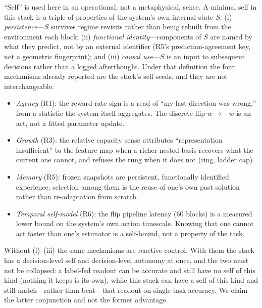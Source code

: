 \documentclass[preprint,12pt]{elsarticle}
\begin{document}
``Self'' is used here in an operational, not a metaphysical, sense. A minimal
self in this stack is a triple of properties of the system's own internal
state $S$: (i) \emph{persistence}---$S$ survives regime revisits rather than
being rebuilt from the environment each block; (ii) \emph{functional
identity}---components of $S$ are named by what they predict, not by an
external identifier (R5's prediction-agreement key, not a geometric
fingerprint); and (iii) \emph{causal use}---$S$ is an input to subsequent
decisions rather than a logged afterthought. Under that definition the four
mechanisms already reported are the stack's self-seeds, and they are not
interchangeable:

\begin{itemize}[leftmargin=1.4em,itemsep=2pt,topsep=2pt]
\item \emph{Agency} (R1): the reward-rate sign is a read of ``my last
direction was wrong,'' from a statistic the system itself aggregates. The
discrete flip $w\to-w$ is an act, not a fitted parameter update.
\item \emph{Growth} (R3): the relative capacity sense attributes
``representation insufficient'' to the feature map when a richer nested
basis recovers what the current one cannot, and refuses the rung when it
does not (ring, ladder cap).
\item \emph{Memory} (R5): frozen snapshots are persistent, functionally
identified experience; selection among them is the reuse of one's own past
solution rather than re-adaptation from scratch.
\item \emph{Temporal self-model} (R6): the flip pipeline latency
($60$ blocks) is a measured lower bound on the system's own action
timescale. Knowing that one cannot act faster than one's estimator is a
self-bound, not a property of the task.
\end{itemize}

Without (i)--(iii) the same mechanisms are reactive control. With them the
stack has a decision-level self and decision-level autonomy at once, and the
two must not be collapsed: a label-fed readout can be accurate and still have
no self of this kind (nothing it keeps is its own), while this stack can have
a self of this kind and still match---rather than beat---that readout on
single-task accuracy. We claim the latter conjunction and not the former
advantage.
\end{document}
